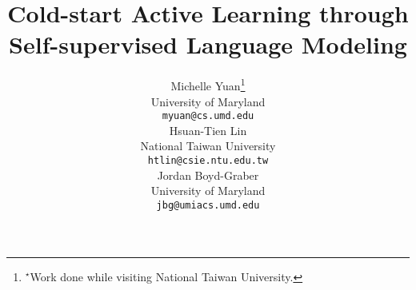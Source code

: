 \documentclass[11pt,a4paper]{article}
\title{Cold-start Active Learning through Self-supervised Language Modeling}
\author{Michelle Yuan\thanks{$^{\star}$Work done while visiting
        National Taiwan University.}\\
    University of Maryland\\
    \texttt{myuan@cs.umd.edu} \\\And
    Hsuan-Tien Lin \\
    National Taiwan University \\
\texttt{htlin@csie.ntu.edu.tw} \\\And
    Jordan Boyd-Graber \\
    University of Maryland\\
\texttt{jbg@umiacs.umd.edu} \\}
\date{}
\newcommand{\latexfile}[1]{}
\begin{document}
\maketitle
\begin{abstract}
\latexfile{00-abstract}
\end{abstract}
\latexfile{10-intro}
\latexfile{20-prelim}
\latexfile{30-dichotomy}
\latexfile{40-alps}
\latexfile{50-experiments}
\latexfile{60-analysis}
\latexfile{70-related}
\latexfile{80-conclusion}
\latexfile{90-acknowledgments}





\latexfile{appendix}
\end{document}
